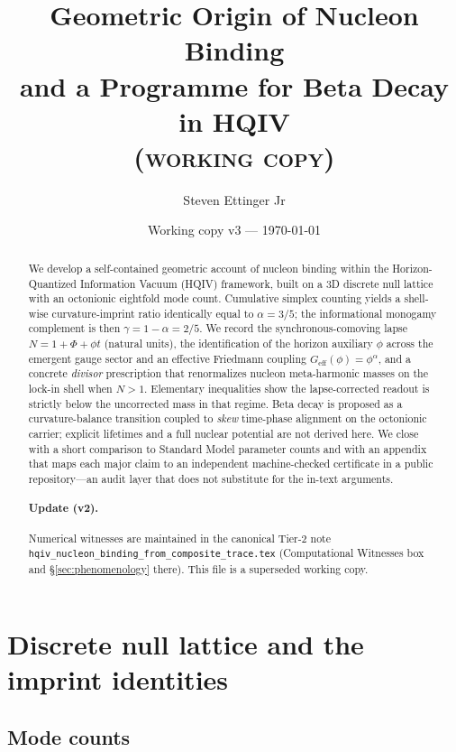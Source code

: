\documentclass[11pt,a4paper]{article}
\title{Geometric Origin of Nucleon Binding\\and a Programme for Beta Decay in HQIV\\{\large\scshape (working copy)}}
\author{Steven Ettinger Jr}
\date{Working copy v3 --- \today}
\theoremstyle{plain}
\theoremstyle{definition}
\theoremstyle{remark}
\theoremstyle{plain}
\theoremstyle{definition}
\begin{document}
\maketitle

\begin{abstract}
We develop a self-contained geometric account of nucleon binding within the Horizon-Quantized Information Vacuum (HQIV) framework, built on a $3$D discrete null lattice with an octonionic eightfold mode count.
Cumulative simplex counting yields a shell-wise curvature-imprint ratio identically equal to $\alpha=3/5$; the informational monogamy complement is then $\gamma=1-\alpha=2/5$.
We record the synchronous-comoving lapse $N=1+\Phi+\phi t$ (natural units), the identification of the horizon auxiliary $\phi$ across the emergent gauge sector and an effective Friedmann coupling $G_{\mathrm{eff}}(\phi)=\phi^{\alpha}$, and a concrete \emph{divisor} prescription that renormalizes nucleon meta-harmonic masses on the lock-in shell when $N>1$.
Elementary inequalities show the lapse-corrected readout is strictly below the uncorrected mass in that regime.
Beta decay is proposed as a curvature-balance transition coupled to \emph{skew} time-phase alignment on the octonionic carrier; explicit lifetimes and a full nuclear potential are not derived here.
We close with a short comparison to Standard Model parameter counts and with an appendix that maps each major claim to an independent machine-checked certificate in a public repository---an audit layer that does not substitute for the in-text arguments.

\paragraph{Update (v2).} Numerical witnesses are maintained in the canonical Tier-2 note
\texttt{hqiv\_nucleon\_binding\_from\_composite\_trace.tex} (Computational Witnesses box
and \S\ref{sec:phenomenology} there). This file is a superseded working copy.
\end{abstract}

\section{Discrete null lattice and the imprint identities}

\subsection{Mode counts}
\end{document}
